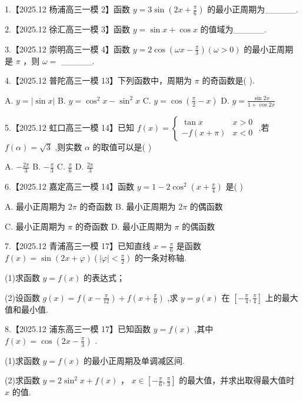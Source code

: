 \documentclass[10pt]{article}
\begin{document}
1.【2025.12 杨浦高三一模 2】函数 \(y = 3\sin \left( {{2x} + \frac{\pi }{6}}\right)\) 的最小正周期为\_\_\_\_\_.

2.【2025.12 徐汇高三一模 3】函数 \(y = \sin x + \cos x\) 的值域为\_\_\_\_\_.

3.【2025.12 崇明高三一模 4】函数 \(y = 2\cos \left( {{\omega x} - \frac{\pi }{3}}\right) \left( {\omega  > 0}\right)\) 的最小正周期是 \(\pi\) ，则 \(\omega  =\) \_\_\_\_\_.

4.【2025.12 普陀高三一模 13】下列函数中，周期为 \(\pi\) 的奇函数是( ).

A. \(y = \left| {\sin x}\right|\) B. \(y = {\cos }^{2}x - {\sin }^{2}x\) C. \(y = \cos \left( {\frac{\pi }{2} - x}\right)\) D. \(y = \frac{\sin {2x}}{1 + \cos {2x}}\)

5.【2025.12 虹口高三一模 14】已知 \(f\left( x\right)  = \left\{  \begin{array}{ll} \tan x & x > 0 \\   - f\left( {x + \pi }\right) & x < 0 \end{array}\right.\) ,若 \(f\left( \alpha \right)  = \sqrt{3}\) ,则实数 \(\alpha\) 的取值可以是( )

A. \(- \frac{2\pi }{3}\) B. \(- \frac{\pi }{3}\) C. \(\frac{\pi }{6}\) D. \(\frac{2\pi }{3}\)

6.【2025.12 嘉定高三一模 14】函数 \(y = 1 - 2{\cos }^{2}\left( {x + \frac{\pi }{4}}\right)\) 是( )

A. 最小正周期为 \({2\pi }\) 的奇函数 B. 最小正周期为 \({2\pi }\) 的偶函数

C. 最小正周期为 \(\pi\) 的奇函数 D. 最小正周期为 \(\pi\) 的偶函数

7.【2025.12 青浦高三一模 17】已知直线 \(x = \frac{\pi }{6}\) 是函数 \(f\left( x\right)  = \sin \left( {{2x} + \varphi }\right) \left( {\left| \varphi \right|  < \frac{\pi }{2}}\right)\) 的一条对称轴.

(1)求函数 \(y = f\left( x\right)\) 的表达式；

(2)设函数 \(g\left( x\right)  = f\left( {x - \frac{\pi }{12}}\right)  + f\left( {x + \frac{\pi }{6}}\right)\) ,求 \(y = g\left( x\right)\) 在 \(\left\lbrack  {-\frac{\pi }{4},\frac{\pi }{4}}\right\rbrack\) 上的最大值和最小值.

8.【2025.12 浦东高三一模 17】已知函数 \(y = f\left( x\right)\) ,其中 \(f\left( x\right)  = \cos \left( {{2x} - \frac{\pi }{3}}\right)\) .

(1)求函数 \(y = f\left( x\right)\) 的最小正周期及单调减区间.

(2)求函数 \(y = 2{\sin }^{2}x + f\left( x\right)\) ， \(x \in  \left\lbrack  {-\frac{\pi }{6},\frac{\pi }{3}}\right\rbrack\) 的最大值，并求出取得最大值时 \(x\) 的值.
\end{document}
